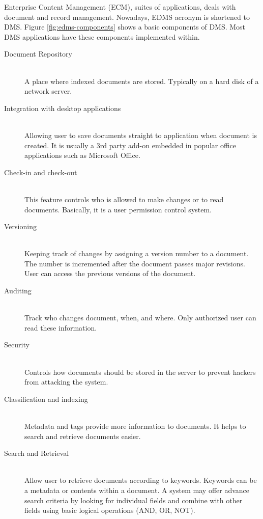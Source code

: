 Enterprise Content Management (ECM), suites of applications, deals with document and record management.
Nowadays, EDMS acronym is shortened to DMS.
Figure \ref{fig:edms-components} shows a basic components of DMS.
Most DMS applications have these components implemented within.
\begin{description}
	\item[Document Repository] \hfill \\
	A place where indexed documents are stored.
	Typically on a hard disk of a network server.
	\item[Integration with desktop applications] \hfill \\
	Allowing user to save documents straight to application when document is created.
	It is usually a 3rd party add-on embedded in popular office applications such as Microsoft Office.
	\item[Check-in and check-out] \hfill \\
	This feature controls who is allowed to make changes or to read documents.
	Basically, it is a user permission control system.
	\item[Versioning] \hfill \\
	Keeping track of changes by assigning a version number to a document.
	The number is incremented after the document passes major revisions.
	User can access the previous versions of the document.
	\item[Auditing] \hfill \\
	Track who changes document, when, and where.
	Only authorized user can read these information.
	\item[Security] \hfill \\
	Controls how documents should be stored in the server to prevent hackers from attacking the system.
	\item[Classification and indexing] \hfill \\
	Metadata and tags provide more information to documents.
	It helps to search and retrieve documents easier.
	\item[Search and Retrieval] \hfill \\
	Allow user to retrieve documents according to keywords.
	Keywords can be a metadata or contents within a document.
	A system may offer advance search criteria by looking for individual fields and combine with other fields using basic logical operations (AND, OR, NOT). 
\end{description}